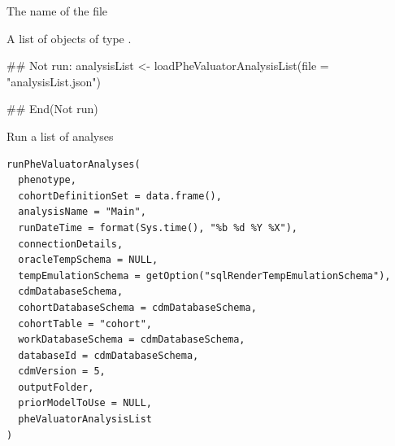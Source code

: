 \documentclass[a4paper]{book}
\begin{document}
%
\begin{Arguments}
\begin{ldescription}
\item[\code{file}] The name of the file
\end{ldescription}
\end{Arguments}
%
\begin{Value}
A list of objects of type .
\end{Value}
%
\begin{Examples}
\begin{ExampleCode}
## Not run: 
analysisList <- loadPheValuatorAnalysisList(file = "analysisList.json")

## End(Not run)

\end{ExampleCode}
\end{Examples}
%
\begin{Description}
Run a list of analyses
\end{Description}
%
\begin{Usage}
\begin{verbatim}
runPheValuatorAnalyses(
  phenotype,
  cohortDefinitionSet = data.frame(),
  analysisName = "Main",
  runDateTime = format(Sys.time(), "%b %d %Y %X"),
  connectionDetails,
  oracleTempSchema = NULL,
  tempEmulationSchema = getOption("sqlRenderTempEmulationSchema"),
  cdmDatabaseSchema,
  cohortDatabaseSchema = cdmDatabaseSchema,
  cohortTable = "cohort",
  workDatabaseSchema = cdmDatabaseSchema,
  databaseId = cdmDatabaseSchema,
  cdmVersion = 5,
  outputFolder,
  priorModelToUse = NULL,
  pheValuatorAnalysisList
)
\end{verbatim}
\end{Usage}
%
\end{document}
